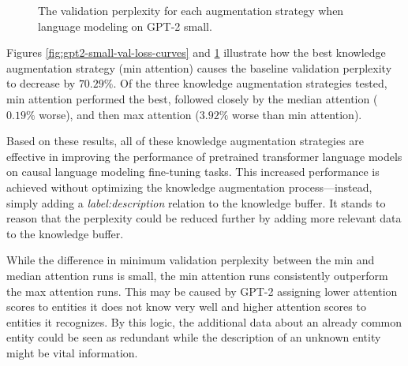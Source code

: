 \documentclass[phd,electronic,oneside,twosidetoc,letterpaper,chaptercenter,parttop,lof]{byumsphd}
\begin{document}
\begin{figure}
\centering
{}  
    \caption[GPT-2 small validation loss chart]{
        The validation perplexity for each augmentation strategy when language modeling on GPT-2 small.
    }
    \label{fig:gpt2-small-val-loss-chart}
\end{figure}

Figures \ref{fig:gpt2-small-val-loss-curves} and \ref{fig:gpt2-small-val-loss-chart} illustrate how the best knowledge augmentation strategy (min attention) causes the baseline validation perplexity to decrease by $70.29\%$.
Of the three knowledge augmentation strategies tested, min attention performed the best, followed closely by the median attention ($0.19\%$ worse), and then max attention ($3.92\%$ worse than min attention).

Based on these results, all of these knowledge augmentation strategies are effective in improving the performance of pretrained transformer language models on causal language modeling fine-tuning tasks.
This increased performance is achieved without optimizing the knowledge augmentation process---instead, simply adding a \emph{label:description}  relation to the knowledge buffer.
It stands to reason that the perplexity could be reduced further by adding more relevant data to the knowledge buffer.

While the difference in minimum validation perplexity between the min and median attention runs is small, the min attention runs consistently outperform the max attention runs.
This may be caused by GPT-2 assigning lower attention scores to entities it does not know very well and higher attention scores to entities it recognizes.
By this logic, the additional data about an already common entity could be seen as redundant while the description of an unknown entity might be vital information.
\end{document}
